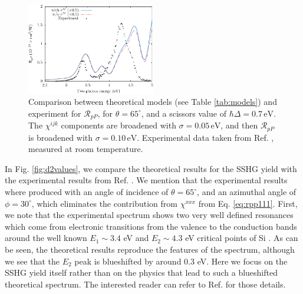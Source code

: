 \begin{figure}[H]
\centering
\includegraphics[width=0.5\textwidth]{content/figures/fig-Si1x1-MRno1w}
\caption{Comparison between theoretical models (see Table \ref{tab:models}) and experiment for $\mathcal{R}_{pP}$, for $\theta=65^{\circ}$, and a scissors value of $\hbar\Delta = 0.7\,\text{eV}$. The $\chi^{ijk}$ components are broadened with $\sigma=0.05\,\text{eV}$, and then $\mathcal{R}_{pP}$ is broadened with $\sigma=0.10\,\text{eV}$. Experimental data taken from Ref. \cite{mitchellSS01}, measured at room temperature.}
\label{fig:mr2}
\end{figure}

In Fig. \ref{fig:d2values}, we compare the theoretical results for the SSHG yield with the experimental results from Ref. \cite{mejiaPRB02}. We mention that the experimental results where produced with an angle of incidence of $\theta=65^\circ$, and an azimuthal angle of $\phi=30^\circ$, which eliminates the contribution from $\chi^{xxx}$ from Eq. \eqref{eq:rpp111}. First, we note that the experimental spectrum shows two very well defined resonances which come from electronic transitions from the valence to the conduction bands around the well known $E_{1}\sim 3.4$ eV and $E_{2}\sim 4.3$ eV critical points of Si \cite{yubook}. As can be seen, the theoretical results reproduce the features of the spectrum, although we see that the $E_{2}$ peak is blueshifted by around 0.3 eV. Here we focus on the SSHG yield itself rather than on the physics that lead to such a blueshifted theoretical spectrum. The interested reader can refer to Ref. \cite{andersonPRB16} for those details.

